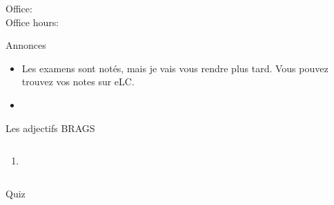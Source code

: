 \documentclass{beamer}
\subtitle[Adjectifs prénominaux]{Les adjectifs prénominaux}
\begin{document}
  \begin{frame}
    \titlepage
    \tiny{Office: \\
          Office hours: }
  \end{frame}

  \begin{frame}{Annonces}
    \begin{itemize}
      \item Les examens sont notés, mais je vais vous rendre plus tard. Vous pouvez trouvez vos notes sur eLC.
      \item[] 
    \end{itemize}
  \end{frame}

  \begin{frame}{Les adjectifs BRAGS}
    \begin{columns}
        \begin{enumerate}
          \item %
        \end{enumerate}
        \begin{minipage}[c][0.6\textheight]{\linewidth}
          \begin{center}
          \end{center}
        \end{minipage}
    \end{columns}
  \end{frame}

  \begin{frame}{}
    \begin{center}
      \Large Quiz
    \end{center}
  \end{frame}
\end{document}

